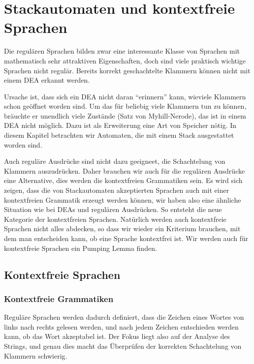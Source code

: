 %
%
\chapter{Stackautomaten und kontextfreie Sprachen\label{chapter-cfl}}
Die regulären Sprachen bilden zwar eine interessante Klasse
von Sprachen mit mathematisch sehr attraktiven Eigenschaften,
doch sind viele praktisch wichtige Sprachen nicht regulär.
Bereits korrekt geschachtelte Klammern können nicht mit einem
DEA erkannt werden.

Ursache ist, dass sich ein DEA nicht
daran ``erinnern'' kann, wieviele Klammern schon geöffnet
worden sind. Um das für beliebig viele Klammern tun zu können,
bräuchte er unendlich viele Zustände (Satz von Myhill-Nerode),
das ist in einem DEA nicht möglich. Dazu ist als Erweiterung
eine Art von Speicher nötig. In diesem Kapitel betrachten
wir Automaten, die mit einem Stack ausgestattet worden sind.

%
%
Auch reguläre Ausdrücke sind nicht dazu geeigneet, die Schachtelung
von Klammern auszudrücken. Daher brauchen wir auch für die
regulären Ausdrücke eine Alternative, dies werden die kontextfreien
Grammatiken sein. Es wird sich zeigen, dass die von Stackautomaten
akzeptierten Sprachen auch mit einer kontextfreien Grammatik erzeugt
werden können, wir haben also eine ähnliche Situation wie
bei DEAs und regulären Ausdrücken. So entsteht die neue
Kategorie der kontextfreien Sprachen.
%
Natürlich werden auch kontextfreie Sprachen nicht alles
abdecken, so dass wir wieder ein Kriterium brauchen, mit dem
man entscheiden kann, ob eine Sprache kontextfrei ist. Wir
werden auch für kontextfreie Sprachen
ein Pumping Lemma finden.

\section{Kontextfreie Sprachen}
\subsection{Kontextfreie Grammatiken}
Reguläre Sprachen werden dadurch definiert, dass die Zeichen
eines Wortes von links nach rechts gelesen werden, und nach jedem
Zeichen entschieden werden kann, ob das Wort akzeptabel ist.
Der Fokus liegt also auf der Analyse des Strings, und genau dies
macht das Überprüfen der korrekten Schachtelung von Klammern
schwierig. 

